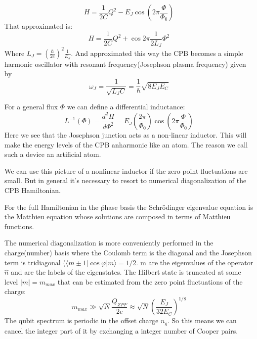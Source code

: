 \documentclass[12pt]{article}
\numberwithin{equation}{subsection}
\newcommand\ask[1]{
{%
}
}
\newcommand\page[1]{
{
}
}
\begin{document}
\begin{equation}
    H = \frac{1}{2C}Q^2 - E_J \cos \left (2\pi \frac{\Phi}{\Phi_0}\right)
\end{equation}
That approximated is:
\begin{equation}
    H = \frac{1}{2C}Q^2 + \cos 2\pi \frac{1}{2L_J}\Phi^2
\end{equation}
Where $L_J = \left(\frac{\hbar}{2e}\right)^2\frac{1}{E_J}$.
And approximated this way the CPB becomes a simple harmonic oscillator with resonant frequency(Josephson plasma frequency) given by
\begin{equation}
    \omega_J = \frac{1}{\sqrt{L_JC}} = \frac{1}{\hbar}\sqrt{8E_JE_C}
\end{equation}
\page{50}
For a general flux $\Phi$ we can define a differential inductance:
\begin{equation}
    L^{-1}(\Phi)=\frac{d^2H}{d\Phi^2} = E_J \left(\frac{2\pi}{\Phi_0}\right)\cos \left(2\pi\frac{\Phi}{\Phi_0}\right)
\end{equation}
Here we see that the Josephson junction acts as a non-linear inductor. This will make the energy levels of the CPB anharmonic like an atom. The reason we call such a device an artificial atom.

We can use this picture of a nonlinear inductor if the zero point fluctuations are small. But in general it's necessary to resort to numerical diagonalization of the CPB Hamiltonian.

For the full Hamiltonian in the ṕhase basis the Schrödinger eigenvalue equation is the Matthieu equation whose solutions are composed in terms of Matthieu functions.
\ask{O que são funções de Matthieu?}
The numerical diagonalization is more conveniently performed in the charge(number) basis where the Coulomb term is the diagonal and the Josephson term is tridiagonal ($\langle m\pm1|\cos\varphi |m\rangle = 1/2$. m are the eigenvalues of the operator $\hat n$ and are the labels of the eigenstates. The Hilbert state is truncated at some level $|m|=m_{max}$ that can be estimated from the zero point fluctuations of the charge:
\begin{equation}
    m_{max} \gg \sqrt{N}\frac{Q_{ZPF}}{2e} \approx \sqrt N \left(\frac {E_J}{32E_C}\right)^{1/8}
\end{equation}
The qubit spectrum is periodic in the offset charge $n_g$. So this means we can cancel the integer part of it by exchanging a integer number of Cooper pairs. 
\page{51}
\end{document}
